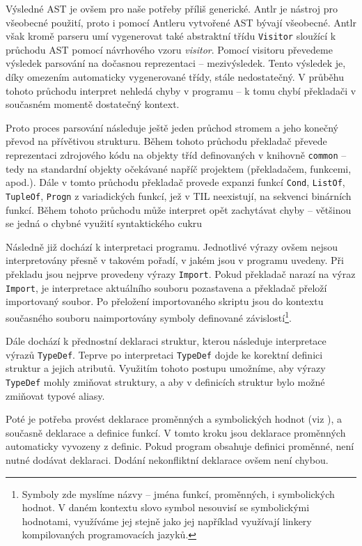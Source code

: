 Výsledné AST je ovšem pro naše potřeby příliš generické. Antlr je nástroj pro všeobecné použití,
proto i pomocí Antleru vytvořené AST bývají všeobecné. Antlr však kromě parseru umí vygenerovat také
abstraktní třídu \lstinline{Visitor} sloužící k průchodu AST pomocí návrhového vzoru
\textit{visitor}. Pomocí visitoru převedeme výsledek parsování na dočasnou reprezentaci --
mezivýsledek. Tento výsledek je, díky omezením automaticky vygenerované třídy, stále nedostatečný.
V průběhu tohoto průchodu interpret nehledá chyby v programu -- k tomu chybí překladači v současném
momentě dostatečný kontext.

Proto proces parsování následuje ještě jeden průchod stromem a jeho konečný převod na přívětivou
strukturu. Během tohoto průchodu překladač převede reprezentaci zdrojového kódu na objekty tříd
definovaných v knihovně \lstinline{common} -- tedy na standardní objekty očekávané napříč projektem
(překladačem, funkcemi, apod.). Dále v tomto průchodu překladač provede expanzi funkcí
\lstinline{Cond}, \lstinline{ListOf}, \lstinline{TupleOf}, \lstinline{Progn} z variadických funkcí,
jež v TIL neexistují, na sekvenci binárních funkcí. Během tohoto průchodu může interpret opět
zachytávat chyby -- většinou se jedná o chybné využití syntaktického cukru

Následně již dochází k interpretaci programu. Jednotlivé výrazy ovšem nejsou interpretovány přesně
v takovém pořadí, v jakém jsou v programu uvedeny. Při překladu jsou nejprve provedeny výrazy
\lstinline{Import}. Pokud překladač narazí na výraz \lstinline{Import}, je interpretace aktuálního
souboru pozastavena a překladač přeloží importovaný soubor. Po přeložení importovaného skriptu
jsou do kontextu současného souboru naimportovány symboly definované závislostí\footnote{
  Symboly zde myslíme názvy -- jména funkcí, proměnných, i symbolických hodnot. V daném kontextu
  slovo symbol nesouvisí se symbolickými hodnotami, využíváme jej stejně jako jej například
  využívají linkery kompilovaných programovacích jazyků.
}.

Dále dochází k přednostní deklaraci struktur, kterou následuje interpretace výrazů
\lstinline{TypeDef}. Teprve po interpretaci \lstinline{TypeDef} dojde ke korektní definici struktur
a jejich atributů. Využitím tohoto postupu umožníme, aby výrazy \lstinline{TypeDef} mohly zmiňovat
struktury, a aby v definicích struktur bylo možné zmiňovat typové aliasy.

Poté je potřeba provést deklarace proměnných a symbolických hodnot (viz ),
a současně deklarace a definice funkcí. V tomto kroku jsou deklarace proměnných automaticky
vyvozeny z definic. Pokud program obsahuje definici proměnné, není nutné dodávat deklaraci. Dodání
nekonfliktní deklarace ovšem není chybou.

